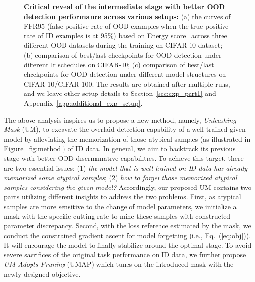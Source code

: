 \documentclass{article}
\theoremstyle{plain}
\theoremstyle{definition}
\theoremstyle{remark}
\begin{document}
\begin{figure*}[t!]
\begin{center}
    \hspace{-0.10in}
   \hspace{0.15in}
\end{center}
\vspace{-5mm}
\caption{\textbf{Critical reveal of the intermediate stage with better OOD detection performance across various setups:} (a) the curves of FPR95 (false positive rate of OOD examples when the true positive rate of ID examples is at 95\%) based on Energy score~\citep{liu2020energy} across three different OOD datasets during the training on CIFAR-10 dataset; (b) comparison of best/last checkpoints for OOD detection under different lr schedules on CIFAR-10; (c) comparison of best/last checkpoints for OOD detection under different model structures on CIFAR-10/CIFAR-100. The results are obtained after multiple runs, and we leave other setup details to Section~\ref{sec:exp_part1} and Appendix~\ref{app:additional_exp_setup}.
}
\label{fig: motivation_1}
\vspace{-4mm}
\end{figure*}



The above analysis inspires us to propose a new method, namely, \textit{Unleashing Mask} (UM), to excavate the overlaid detection capability of a well-trained given model by alleviating the memorization of those atypical samples (as illustrated in Figure~\ref{fig:method}) of ID data. In general, we aim to backtrack its previous stage with better OOD discriminative capabilities. To achieve this target, there are two essential issues: (1) \textit{the model that is well-trained on ID data has already memorized some atypical samples}; (2) \textit{how to forget those memorized atypical samples considering the given model?} Accordingly, our proposed UM contains two parts utilizing different insights to address the two problems. First, as atypical samples are more sensitive to the change of model parameters, we initialize a mask with the specific cutting rate to mine these samples with constructed parameter discrepancy. Second, with the loss reference estimated by the mask, we conduct the constrained gradient ascent for model forgetting (i.e., Eq.~(\ref{eq:obj})). It will encourage the model to finally stabilize around the optimal stage. To avoid severe sacrifices of the original task performance on ID data, we further propose \textit{UM Adopts Pruning} (UMAP) which tunes on the introduced mask with the newly designed objective.
\end{document}

